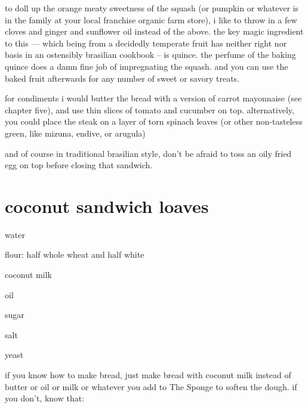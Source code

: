 to doll up the orange meaty sweetness of the squash (or pumpkin or
whatever is in the family at your local franchise organic farm store),
i like to throw in a few cloves and ginger and sunflower oil instead
of the above. the key magic ingredient to this --- which being from a
decidedly temperate fruit has neither right nor basis in an ostensibly
brasilian cookbook -- is quince. the perfume of the baking quince does
a damn fine job of impregnating the squash. and you can use the baked
fruit afterwards for any number of sweet or savory treats.

for condiments i would butter the bread with a version of carrot
mayonnaise (see chapter five), and use thin slices of tomato and
cucumber on top. alternatively, you could place the steak on a layer
of torn spinach leaves (or other non-tasteless green, like mizuna,
endive, or arugula)

and of course in traditional brasilian style, don't be afraid to toss
an oily fried egg on top before closing that sandwich.

\section{coconut sandwich loaves}

\begin{ingredients}
  \item water
  \item flour: half whole wheat and half white
  \item coconut milk
  \item oil
  \item sugar
  \item salt
  \item yeast
\end{ingredients}

if you know how to make bread, just make bread with coconut milk
instead of butter or oil or milk or whatever you add to The Sponge to
soften the dough. if you don't, know that:

